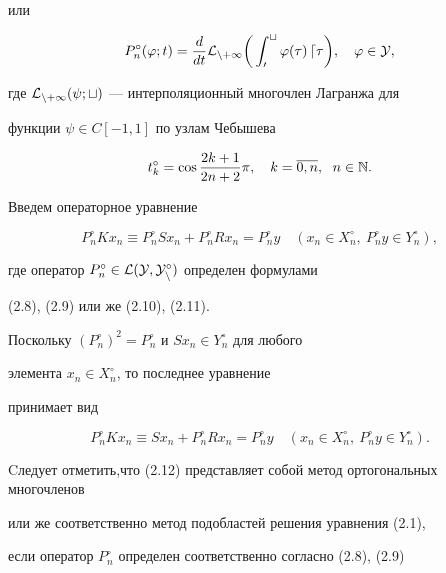 или


\begin{equation}


P_n^\circ (\varphi ;t)=\frac{d}{dt}\cal L_{n+1}\bigg(\int


_0^t\varphi (\tau)\, d\tau \bigg),\quad \varphi\in Y,


\end{equation}


где $\cal L_{n+1}(\psi ;t)$ --- интерполяционный многочлен Лагранжа для


функции $\psi\in C[-1,1]$ по узлам Чебышева


\begin{equation}


t_k^\circ =\cos{ \frac{2k+1}{2n+2}\pi},\quad k=\overline{0,n},


\ \;n\in\Bbb N.


\end{equation}





Введем операторное уравнение


$$


P_n^\circ Kx_n\equiv P_n^\circ Sx_n+P_n^\circ Rx_n=P_n^\circ y\quad


(x_n\in X_n^\circ,\ P_n^\circ y\in Y_n^\circ ),


$$


где оператор $P_n^\circ\in \cal L(Y,Y_n^\circ)$ определен формулами


(2.8), (2.9) или же (2.10), (2.11).


Поскольку $(P_n^\circ)^2=P_n^\circ$ и $Sx_n\in Y_n^\circ$ для любого


элемента $x_n \in X_n^\circ $, то последнее уравнение


принимает вид


\begin{equation}


P_n^\circ Kx_n\equiv Sx_n+P_n^\circ Rx_n=P_n^\circ y\quad


(x_n\in X_n^\circ ,\ P_n^\circ y\in Y_n^\circ).


\end{equation}


Cледует отметить,что (2.12) представляет собой метод ортогональных многочленов


или же соответственно метод подобластей решения уравнения (2.1),


если оператор $P_n^\circ$ определен соответственно согласно (2.8), (2.9)


